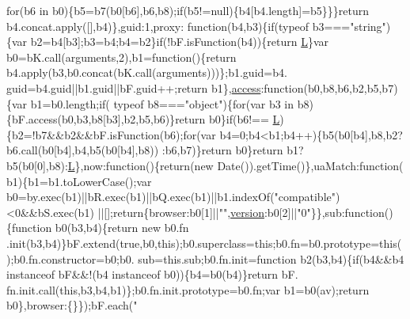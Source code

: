 \begin{DoxyCode}
{      for}(b6 in b0)\{b5=b7(b0[b6],b6,b8);\textcolor{keywordflow}{if}(b5!=null)\{b4[b4.length]=b5\}\}\}\textcolor{keywordflow}{return} b4.concat.apply([],b4)\},guid:1,proxy:\textcolor{keyword}{
      function}(b4,b3)\{\textcolor{keywordflow}{if}(typeof b3===\textcolor{stringliteral}{"string"})\{var b2=b4[b3];b3=b4;b4=b2\}\textcolor{keywordflow}{if}(!bF.isFunction(b4))\{\textcolor{keywordflow}{return} 
      \hyperlink{docs_2_programmer's_manual_2html_2jquery_8js_a38ee4c0b5f4fe2a18d0c783af540d253}{L}\}var b0=bK.call(arguments,2),b1=\textcolor{keyword}{function}()\{\textcolor{keywordflow}{return} b4.apply(b3,b0.concat(bK.call(arguments)))\};b1.guid=b4.
      guid=b4.guid||b1.guid||bF.guid++;\textcolor{keywordflow}{return} b1\},\hyperlink{tables_8h_a360a726ac0b61d9e4e1be3ad34f80244}{access}:\textcolor{keyword}{function}(b0,b8,b6,b2,b5,b7)\{var b1=b0.length;\textcolor{keywordflow}{if}(
      typeof b8===\textcolor{stringliteral}{"object"})\{\textcolor{keywordflow}{for}(var b3 in b8)\{bF.access(b0,b3,b8[b3],b2,b5,b6)\}\textcolor{keywordflow}{return} b0\}\textcolor{keywordflow}{if}(b6!==
      \hyperlink{docs_2_programmer's_manual_2html_2jquery_8js_a38ee4c0b5f4fe2a18d0c783af540d253}{L})\{b2=!b7&&b2&&bF.isFunction(b6);\textcolor{keywordflow}{for}(var b4=0;b4<b1;b4++)\{b5(b0[b4],b8,b2?b6.call(b0[b4],b4,b5(b0[b4],b8))
      :b6,b7)\}\textcolor{keywordflow}{return} b0\}\textcolor{keywordflow}{return} b1?b5(b0[0],b8):\hyperlink{docs_2_programmer's_manual_2html_2jquery_8js_a38ee4c0b5f4fe2a18d0c783af540d253}{L}\},now:function()\{\textcolor{keywordflow}{return}(\textcolor{keyword}{new} Date()).getTime()\},uaMatch:\textcolor{keyword}{function}(
      b1)\{b1=b1.toLowerCase();var b0=by.exec(b1)||bR.exec(b1)||bQ.exec(b1)||b1.indexOf(\textcolor{stringliteral}{"compatible"})<0&&bS.exec(b1)
      ||[];\textcolor{keywordflow}{return}\{browser:b0[1]||\textcolor{stringliteral}{""},\hyperlink{version_8c_a6080dae0886626b9a4cedb29240708b1}{version}:b0[2]||\textcolor{stringliteral}{"0"}\}\},sub:\textcolor{keyword}{function}()\{\textcolor{keyword}{function} b0(b3,b4)\{\textcolor{keywordflow}{return} \textcolor{keyword}{new} b0.fn
      .init(b3,b4)\}bF.extend(\textcolor{keyword}{true},b0,\textcolor{keyword}{this});b0.superclass=\textcolor{keyword}{this};b0.fn=b0.prototype=\textcolor{keyword}{this}();b0.fn.constructor=b0;b0.
      sub=this.sub;b0.fn.init=\textcolor{keyword}{function} b2(b3,b4)\{\textcolor{keywordflow}{if}(b4&&b4 instanceof bF&&!(b4 instanceof b0))\{b4=b0(b4)\}\textcolor{keywordflow}{return} bF.
      fn.init.call(\textcolor{keyword}{this},b3,b4,b1)\};b0.fn.init.prototype=b0.fn;var b1=b0(av);\textcolor{keywordflow}{return} b0\},browser:\{\}\});bF.each(\textcolor{stringliteral}{"
}
\end{DoxyCode}
